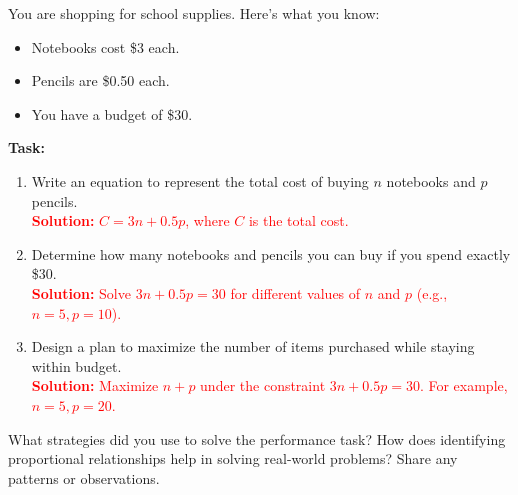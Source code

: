 \documentclass[10pt]{article}
\begin{document}
\vspace{1em}
\begin{tcolorbox}[colframe=black!60, colback=white, 
coltitle=black, colbacktitle=black!15, fonttitle=\bfseries\Large, 
title=Performance Task: Planning a Shopping Trip, halign title=center, left=10pt, right=10pt, top=10pt, bottom=80pt]
You are shopping for school supplies. Here’s what you know:
\begin{itemize}
    \item Notebooks cost \$3 each.
    \item Pencils are \$0.50 each.
    \item You have a budget of \$30.
\end{itemize}
\textbf{Task:}
\begin{enumerate}[itemsep=4em]
    \item Write an equation to represent the total cost of buying \(n\) notebooks and \(p\) pencils.\\
    \textcolor{red}{\textbf{Solution:} \(C = 3n + 0.5p\), where \(C\) is the total cost.}

    \item Determine how many notebooks and pencils you can buy if you spend exactly \$30.\\
    \textcolor{red}{\textbf{Solution:} Solve \(3n + 0.5p = 30\) for different values of \(n\) and \(p\) (e.g., \(n = 5, p = 10\)).}

    \item Design a plan to maximize the number of items purchased while staying within budget.\\
    \textcolor{red}{\textbf{Solution:} Maximize \(n + p\) under the constraint \(3n + 0.5p = 30\). For example, \(n = 5, p = 20\).}
\end{enumerate}
\end{tcolorbox}

\vspace{1em}
\begin{tcolorbox}[colframe=black!60, colback=white, 
coltitle=black, colbacktitle=black!15, fonttitle=\bfseries\Large, 
title=Reflection, halign title=center, left=10pt, right=10pt, top=10pt, bottom=110pt]
What strategies did you use to solve the performance task? How does identifying proportional relationships help in solving real-world problems? Share any patterns or observations.
\end{tcolorbox}
\end{document}
